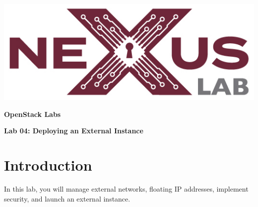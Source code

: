 \documentclass[letterpaper, 12pt]{article}
\begin{document}
\begin{titlepage}
    \centering
    \includegraphics[scale=0.5]{images/nexus_lab_logo.png}

    \vspace*{\baselineskip}

    \textbf{\Large OpenStack Labs}

    \vspace*{\baselineskip}

    \textbf{\Large Lab 04: Deploying an External Instance}
    \vspace*{\fill}
\end{titlepage}

{
    \fancyhf{}
    \fancyfoot[R]{\footnotesize\thepage}
    \renewcommand{\headrulewidth}{0pt}
}

\pagestyle{fancy}
\tableofcontents
\clearpage

\section*{Introduction}
\label{sec:introduction}
In this lab, you will manage external networks, floating IP addresses, implement security, and launch an external
instance.
\end{document}
